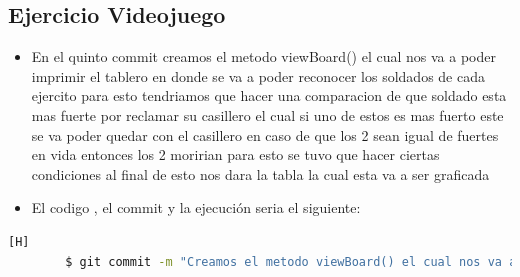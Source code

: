 \documentclass{article}
\begin{document}
	\subsection{Ejercicio Videojuego}
	\begin{itemize}	
		\item En el quinto commit creamos el metodo viewBoard() el cual nos va a poder imprimir el tablero en donde se va a poder reconocer los soldados de cada ejercito para esto tendriamos que hacer una comparacion de que soldado esta mas fuerte por reclamar su casillero el cual si uno de estos es mas fuerto este se va poder quedar con el casillero en caso de que los 2 sean igual de fuertes en vida entonces los 2 moririan para esto se tuvo que hacer ciertas condiciones al final de esto nos dara la tabla la cual esta va a ser graficada
		\item El codigo , el commit y la ejecución seria el siguiente:
	\end{itemize}	
	\begin{lstlisting}[language=bash,caption={Commit}][H]
		$ git commit -m "Creamos el metodo viewBoard() el cual nos va a poder imprimir el tablero en donde se va a poder reconocer los soldados de cada ejercito para esto tendriamos que hacer una comparacion de que soldado esta mas fuerte por reclamar su casillero el cual si uno de estos es mas fuerto este se va poder quedar con el casillero en caso de que los 2 sean igual de fuertes en vida entonces los 2 moririan para esto se tuvo que hacer ciertas condiciones al final de esto nos dara la tabla la cual esta va a ser graficada"
	\end{lstlisting}	
\end{document}
